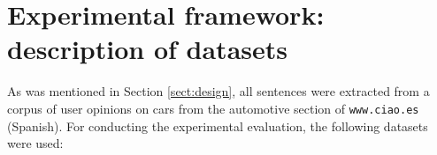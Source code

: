 \documentclass[11pt]{elsarticle}
\begin{document}



\section{Experimental framework: description of datasets}
\label{sect:datasets}

As was mentioned in Section \ref{sect:design}, all sentences were extracted from a corpus of user opinions on cars from the automotive section of \texttt{www.ciao.es} (Spanish). For conducting the experimental evaluation, the following datasets were used:
\end{document}
